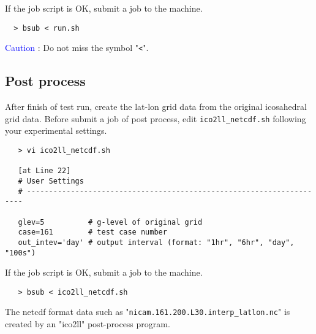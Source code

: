  \noindent If the job script is OK, submit a job to the machine.
 \begin{verbatim}
  > bsub < run.sh
 \end{verbatim}
 \noindent \textcolor{blue}{{\sf Caution}} : Do not miss the symbol "\verb|<|". \\


\subsection{Post process}
 After finish of test run, create the lat-lon grid data from
 the original icosahedral grid data.
 Before submit a job of post process, edit \verb|ico2ll_netcdf.sh|
 following your experimental settings.
 \begin{verbatim}
   > vi ico2ll_netcdf.sh

   [at Line 22]
   # User Settings
   # ---------------------------------------------------------------------

   glev=5          # g-level of original grid
   case=161        # test case number
   out_intev='day' # output interval (format: "1hr", "6hr", "day", "100s")
 \end{verbatim}

 \noindent If the job script is OK, submit a job to the machine.
 \begin{verbatim}
   > bsub < ico2ll_netcdf.sh
 \end{verbatim}

 \noindent The netcdf format data such as "\verb|nicam.161.200.L30.interp_latlon.nc|"
 is created by an "ico2ll" post-process program.



